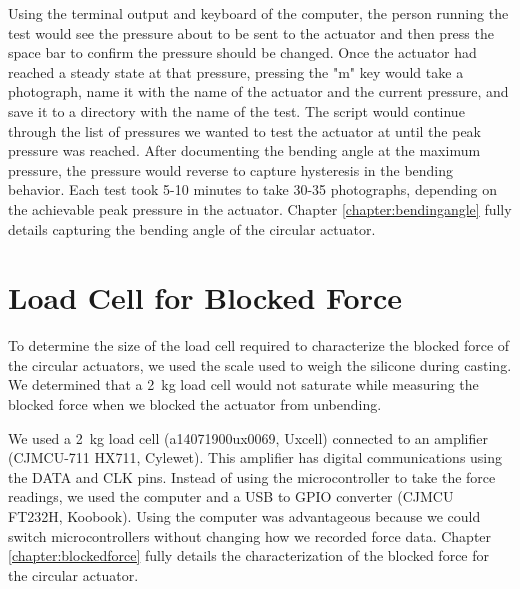 Using the terminal output and keyboard of the computer, the person running the test would see the pressure about to be sent to the actuator and then press the space bar to confirm the pressure should be changed. Once the actuator had reached a steady state at that pressure, pressing the "m" key would take a photograph, name it with the name of the actuator and the current pressure, and save it to a directory with the name of the test. The script would continue through the list of pressures we wanted to test the actuator at until the peak pressure was reached. After documenting the bending angle at the maximum pressure, the pressure would reverse to capture hysteresis in the bending behavior. Each test took 5-10 minutes to take 30-35 photographs, depending on the achievable peak pressure in the actuator. Chapter \ref{chapter:bendingangle} fully details capturing the bending angle of the circular actuator. 

\section{Load Cell for Blocked Force}

To determine the size of the load cell required to characterize the blocked force of the circular actuators, we used the scale used to weigh the silicone during casting. We determined that a 2~kg load cell would not saturate while measuring the blocked force when we blocked the actuator from unbending. 

We used a 2~kg load cell (a14071900ux0069, Uxcell) connected to an amplifier (CJMCU-711 HX711, Cylewet). This amplifier has digital communications using the DATA and CLK pins. Instead of using the microcontroller to take the force readings, we used the computer and a USB to GPIO converter (CJMCU FT232H, Koobook). Using the computer was advantageous because we could switch microcontrollers without changing how we recorded force data. Chapter \ref{chapter:blockedforce} fully details the characterization of the blocked force for the circular actuator. 



